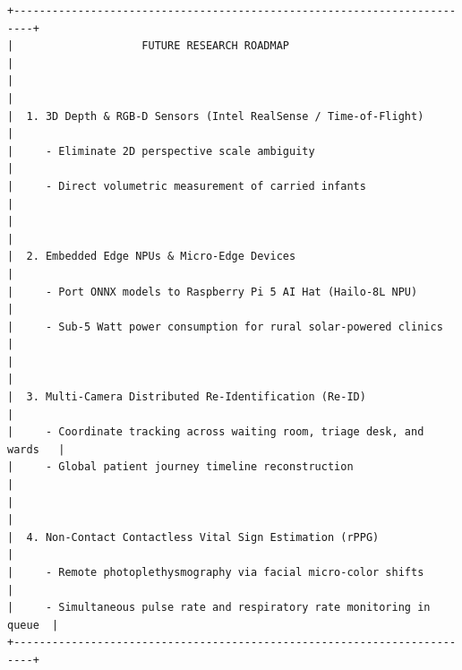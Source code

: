 \begin{verbatim}
+-------------------------------------------------------------------------+
|                    FUTURE RESEARCH ROADMAP                              |
|                                                                         |
|  1. 3D Depth & RGB-D Sensors (Intel RealSense / Time-of-Flight)         |
|     - Eliminate 2D perspective scale ambiguity                          |
|     - Direct volumetric measurement of carried infants                  |
|                                                                         |
|  2. Embedded Edge NPUs & Micro-Edge Devices                             |
|     - Port ONNX models to Raspberry Pi 5 AI Hat (Hailo-8L NPU)          |
|     - Sub-5 Watt power consumption for rural solar-powered clinics      |
|                                                                         |
|  3. Multi-Camera Distributed Re-Identification (Re-ID)                  |
|     - Coordinate tracking across waiting room, triage desk, and wards   |
|     - Global patient journey timeline reconstruction                    |
|                                                                         |
|  4. Non-Contact Contactless Vital Sign Estimation (rPPG)                |
|     - Remote photoplethysmography via facial micro-color shifts         |
|     - Simultaneous pulse rate and respiratory rate monitoring in queue  |
+-------------------------------------------------------------------------+
\end{verbatim}

